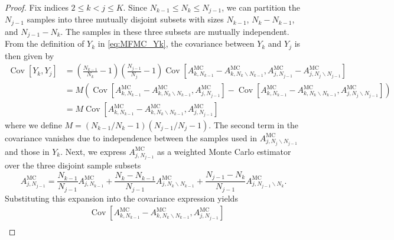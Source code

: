 \begin{proof}
Fix indices $2\le k<j\le K$. Since $N_{k-1}\le N_k\le N_{j-1}$, we can partition the $N_{j-1}$ samples into three mutually disjoint subsets with sizes $N_{k-1}$, $N_{k}-N_{k-1}$, and $N_{j-1} - N_{k}$. The samples in these three subsets are mutually independent. From the definition of $Y_k$ in \eqref{eq:MFMC_Yk},  the covariance between $Y_k$ and $Y_j$ is then given by
\begin{align*}
    \operatorname{Cov}\left[Y_k,Y_j\right] &= \left(\frac{N_{k-1}}{N_k}-1\right) \left(\frac{N_{j-1}}{N_j}-1\right)\operatorname{Cov}\left[A_{k, N_{k-1}}^{\text{MC}} - A_{k,N_{k}\backslash N_{k-1}}^{\text{MC}}, A_{j,N_{j-1}}^{\text{MC}} - A_{j,N_{j}\backslash N_{j-1}}^{\text{MC}}\right] \\
    & = M \left(\operatorname{Cov}\left[A_{k,N_{k-1}}^{\text{MC}} - A_{k,N_{k}\backslash N_{k-1}}^{\text{MC}}, A_{j,N_{j-1}}^{\text{MC}}\right] - \operatorname{Cov}\left[A_{k,N_{k-1}}^{\text{MC}} - A_{k,N_{k}\backslash N_{k-1}}^{\text{MC}}, A_{j,N_{j}\backslash N_{j-1}}^{\text{MC}}\right] \right)\\
    & = M \operatorname{Cov}\left[A_{k,N_{k-1}}^{\text{MC}} - A_{k,N_{k}\backslash N_{k-1}}^{\text{MC}}, A_{j,N_{j-1}}^{\text{MC}}\right]
\end{align*}
where we define $M = (N_{k-1}/N_k-1) (N_{j-1}/N_j-1)$. The second term in the covariance vanishes due to independence between the samples used in $A_{j,N_{j}\backslash N_{j-1}}^{\text{MC}}$ and those in $Y_k$. Next, we express $A_{j,N_{j-1}}^{\text{MC}}$ as a weighted Monte Carlo estimator over the three disjoint sample subsets
%
\begin{equation*}
    A_{j,N_{j-1}}^{\text{MC}} = \frac{N_{k-1}}{N_{j-1}}A_{j,N_{k-1}}^{\text{MC}} + \frac{N_k - N_{k-1}}{N_{j-1}} A_{j,N_{k}\backslash N_{k-1}}^{\text{MC}} + \frac{N_{j-1} - N_k}{N_{j-1}} A_{j,N_{j-1}\backslash N_{k}}^{\text{MC}}.
\end{equation*}
%
Substituting this expansion into the covariance expression yields
%
\begin{align*}
    &\operatorname{Cov}\left[A_{k,N_{k-1}}^{\text{MC}} - A_{k,N_{k}\backslash N_{k-1}}^{\text{MC}}, A_{j,N_{j-1}}^{\text{MC}}\right]\\

\end{align*}
\end{proof}
